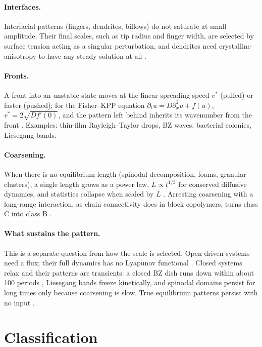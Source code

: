 \documentclass[11pt]{article}
\begin{document}
\paragraph{Interfaces.} Interfacial patterns (fingers, dendrites, billows) do not saturate at small amplitude. Their final scales, such as tip radius and finger width, are selected by surface tension acting as a singular perturbation, and dendrites need crystalline anisotropy to have any steady solution at all \cite{CH,Langer1980,vS2003}.

\paragraph{Fronts.} A front into an unstable state moves at the linear spreading speed $v^*$ (pulled) or faster (pushed); for the Fisher–KPP equation $\partial_tu=D\partial_x^2u+f(u)$, $v^*=2\sqrt{Df'(0)}$, and the pattern left behind inherits its wavenumber from the front \cite{vS2003}. Examples: thin-film Rayleigh–Taylor drops, BZ waves, bacterial colonies, Liesegang bands.

\paragraph{Coarsening.} When there is no equilibrium length (spinodal decomposition, foams, granular clusters), a single length grows as a power law, $L\propto t^{1/3}$ for conserved diffusive dynamics, and statistics collapse when scaled by $L$ \cite{Bray1994,vS2003}. Arresting coarsening with a long-range interaction, as chain connectivity does in block copolymers, turns class C into class B \cite{AR2009}.

\paragraph{What sustains the pattern.} This is a separate question from how the scale is selected. Open driven systems need a flux; their full dynamics has no Lyapunov functional \cite{CH}. Closed systems relax and their patterns are transients: a closed BZ dish runs down within about 100 periods \cite{CH}, Liesegang bands freeze kinetically, and spinodal domains persist for long times only because coarsening is slow. True equilibrium patterns persist with no input \cite{AR2009}.

\section{Classification}\label{sec:classes}
\end{document}
